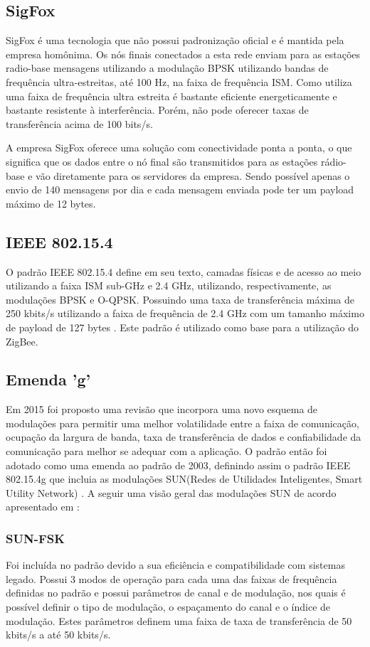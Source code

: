 \subsection{SigFox}
SigFox é uma tecnologia que não possui padronização oficial e é mantida pela empresa homônima. Os nós finais conectados a esta rede enviam para as estações radio-base mensagens utilizando a modulação BPSK utilizando bandas de frequência ultra-estreitas, até 100 Hz, na faixa de frequência ISM. Como utiliza uma faixa de frequência ultra estreita é bastante eficiente energeticamente e bastante resistente à interferência. Porém, não pode oferecer taxas de transferência acima de 100 bits/s.

A empresa SigFox oferece uma solução com conectividade ponta a ponta, o que significa que os dados entre o nó final são transmitidos para as estações rádio-base e vão diretamente para os servidores da empresa. Sendo possível apenas o envio de 140 mensagens por dia e cada mensagem enviada pode ter um payload máximo de 12 bytes.

\subsection{IEEE 802.15.4}
O padrão IEEE 802.15.4 define em seu texto, camadas físicas e de acesso ao meio utilizando a faixa ISM sub-GHz e 2.4 GHz, utilizando, respectivamente, as modulações BPSK e O-QPSK. Possuindo uma taxa de transferência máxima de 250 kbits/s utilizando a faixa de frequência de 2.4 GHz com um tamanho máximo de payload de 127 bytes \cite{munoz2018overview} \cite{gomes2017estimaccao}. Este padrão é utilizado como base para a utilização do ZigBee.

\subsection*{Emenda 'g'}
Em 2015 foi proposto uma revisão que incorpora uma novo esquema de modulações para permitir uma melhor volatilidade entre a faixa de comunicação, ocupação da largura de banda, taxa de transferência de dados e confiabilidade da comunicação para melhor se adequar com a aplicação. O padrão então foi adotado como uma emenda ao padrão de 2003, definindo assim o padrão IEEE 802.15.4g que incluia as modulações SUN(Redes de Utilidades Inteligentes, Smart Utility Network) \cite{tuset2020reliability}.
A seguir uma visão geral das modulações SUN de acordo apresentado em \cite{tuset2020reliability}:
\subsubsection*{SUN-FSK}
Foi incluída no padrão devido a sua eficiência e compatibilidade com sistemas legado. Possui 3 modos de operação para cada uma das faixas de frequência definidas no padrão e possui parâmetros de canal e de modulação, nos quais é possível definir o tipo de modulação, o espaçamento do canal e o índice de modulação. Estes parâmetros definem uma faixa de taxa de transferência de 50 kbits/s a até 50 kbits/s.
